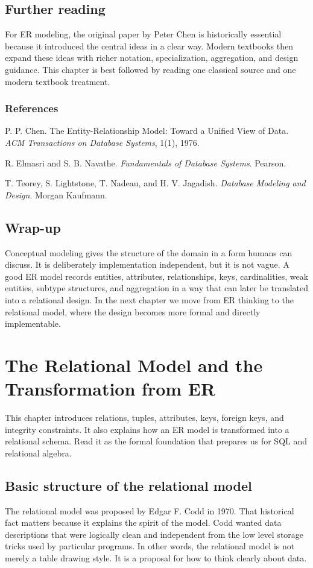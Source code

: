 \documentclass[11pt,a4paper,openany]{book}
\makeatletter
\renewenvironment{thebibliography}[1]
 {\subsection*{References}%
  \list{\@biblabel{\@arabic\c@enumiv}}%
   {\settowidth\labelwidth{\@biblabel{#1}}%
    \leftmargin\labelwidth\advance\leftmargin\labelsep
    \usecounter{enumiv}\let\p@enumiv\@empty
    \renewcommand\theenumiv{\@arabic\c@enumiv}}%
  \sloppy\clubpenalty4000\widowpenalty4000}
 {\endlist}
\makeatother
\begin{document}
\section{Further reading}
For ER modeling, the original paper by Peter Chen is historically essential because it introduced the central ideas in a clear way. Modern textbooks then expand these ideas with richer notation, specialization, aggregation, and design guidance. This chapter is best followed by reading one classical source and one modern textbook treatment.

\begin{thebibliography}{9}
P. P. Chen.
The Entity-Relationship Model: Toward a Unified View of Data.
\textit{ACM Transactions on Database Systems}, 1(1), 1976.

R. Elmasri and S. B. Navathe.
\textit{Fundamentals of Database Systems}. Pearson.

T. Teorey, S. Lightstone, T. Nadeau, and H. V. Jagadish.
\textit{Database Modeling and Design}. Morgan Kaufmann.
\end{thebibliography}

\section{Wrap-up}
Conceptual modeling gives the structure of the domain in a form humans can discuss. It is deliberately implementation independent, but it is not vague. A good ER model records entities, attributes, relationships, keys, cardinalities, weak entities, subtype structures, and aggregation in a way that can later be translated into a relational design. In the next chapter we move from ER thinking to the relational model, where the design becomes more formal and directly implementable.

\chapter{The Relational Model and the Transformation from ER}
\label{ch:relmodel}
\begin{guidancebox}
This chapter introduces relations, tuples, attributes, keys, foreign keys, and integrity constraints. It also explains how an ER model is transformed into a relational schema. Read it as the formal foundation that prepares us for SQL and relational algebra.
\end{guidancebox}

\section{Basic structure of the relational model}
The relational model was proposed by Edgar F. Codd in 1970. That historical fact matters because it explains the spirit of the model. Codd wanted data descriptions that were logically clean and independent from the low level storage tricks used by particular programs. In other words, the relational model is not merely a table drawing style. It is a proposal for how to think clearly about data.
\end{document}

